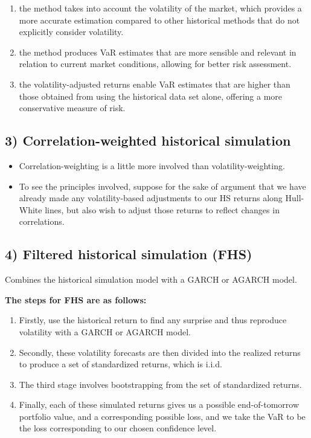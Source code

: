 \begin{mrkeybox}[title={Advantages of the volatility-weighted method}]
\begin{enumerate}
\item {} the method takes into account the volatility of
      the market, which provides a more accurate estimation compared to other historical methods
      that do not explicitly consider volatility.
\item {} the method produces VaR estimates that are more
      sensible and relevant in relation to current market conditions, allowing for better risk
      assessment.
\item {} the volatility-adjusted returns enable VaR estimates that are
      higher than those obtained from using the historical data set alone, offering a more
      conservative measure of risk.
\end{enumerate}
\end{mrkeybox}

\subsection{3) Correlation-weighted historical simulation}
\begin{itemize}
\item Correlation-weighting is a little more involved than volatility-weighting.
\item To see the principles involved, suppose for the sake of argument that we have already made
      any volatility-based adjustments to our HS returns along Hull-White lines, but also wish to
      adjust those returns to reflect changes in correlations.
\end{itemize}

\subsection{4) Filtered historical simulation (FHS)}
Combines the historical simulation model with a GARCH or AGARCH model.

\textbf{The steps for FHS are as follows:}
\begin{enumerate}
\item Firstly, use the historical return to find any surprise and thus reproduce volatility with
      a GARCH or AGARCH model.
\item Secondly, these volatility forecasts are then divided into the realized returns to produce
      a set of standardized returns, which is i.i.d.
\item The third stage involves bootstrapping from the set of standardized returns.
\item Finally, each of these simulated returns gives us a possible end-of-tomorrow portfolio
      value, and a corresponding possible loss, and we take the VaR to be the loss corresponding
      to our chosen confidence level.
\end{enumerate}


